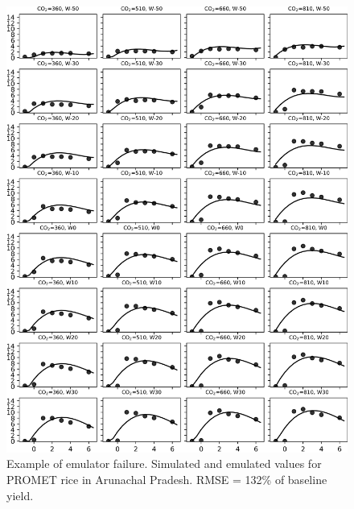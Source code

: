 \documentclass[10pt]{article}
\begin{document}
\begin{figure}[h!]
\includegraphics[width=\textwidth]{promet_rice_bad_arun.png}
\caption{Example of emulator failure. Simulated and emulated values for PROMET rice in Arunachal Pradesh. RMSE = 132\% of baseline yield.}
\label{fig:lpjmlrice}
\end{figure}


\end{document}
